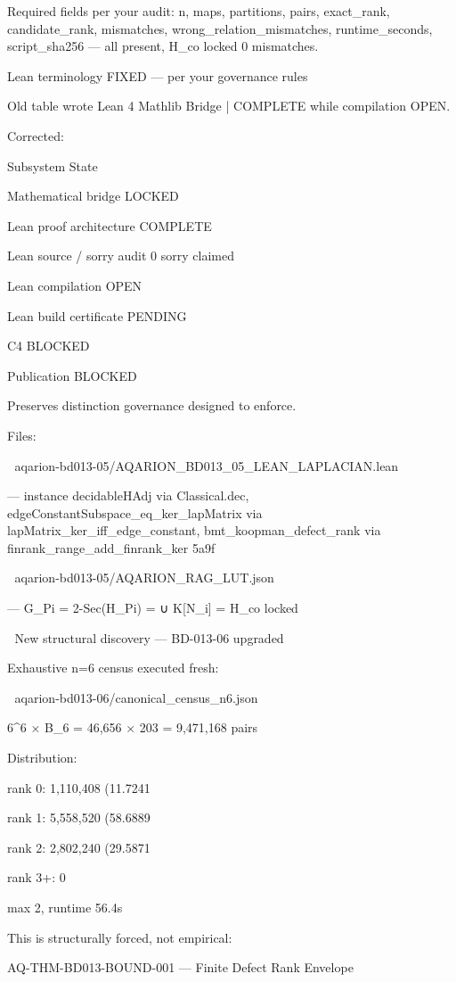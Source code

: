 Required fields per your audit: n, maps, partitions, pairs, exact_rank, candidate_rank, mismatches, wrong_relation_mismatches, runtime_seconds, script_sha256 — all present, H_co locked 0 mismatches.




Lean terminology FIXED — per your governance rules




Old table wrote Lean 4 Mathlib Bridge | COMPLETE while compilation OPEN.


Corrected:


Subsystem	State


Mathematical bridge	LOCKED

Lean proof architecture	COMPLETE

Lean source / sorry audit	0 sorry claimed

Lean compilation	OPEN

Lean build certificate	PENDING

C4	BLOCKED

Publication	BLOCKED

Preserves distinction governance designed to enforce.


Files:


📎 aqarion-bd013-05/AQARION_BD013_05_LEAN_LAPLACIAN.lean

— instance decidableHAdj via Classical.dec, edgeConstantSubspace_eq_ker_lapMatrix via lapMatrix_ker_iff_edge_constant, bmt_koopman_defect_rank via finrank_range_add_finrank_ker 5a9f


📎 aqarion-bd013-05/AQARION_RAG_LUT.json

— G_Pi = 2-Sec(H_Pi) = ∪ K[N_i] = H_co locked


🔷 New structural discovery — BD-013-06 upgraded


Exhaustive n=6 census executed fresh:


📎 aqarion-bd013-06/canonical_census_n6.json

6^6 × B_6 = 46,656 × 203 = 9,471,168 pairs


Distribution:


rank 0: 1,110,408 (11.7241%

rank 1: 5,558,520 (58.6889%

rank 2: 2,802,240 (29.5871%

rank 3+: 0

max 2, runtime 56.4s


This is structurally forced, not empirical:


AQ-THM-BD013-BOUND-001 — Finite Defect Rank Envelope


